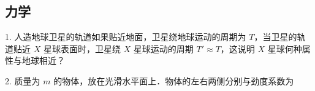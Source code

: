 \subsection{力学}
1. 人造地球卫星的轨道如果贴近地面，卫星绕地球运动的周期为 $T$，当卫星的轨道贴近 $X$ 星球表面时，卫星绕 $X$ 星球运动的周期 $T' \approx T$，这说明 $X$ 星球何种属性与地球相近？

2. 质量为 $m$ 的物体，放在光滑水平面上．物体的左右两侧分别与劲度系数为 $$
